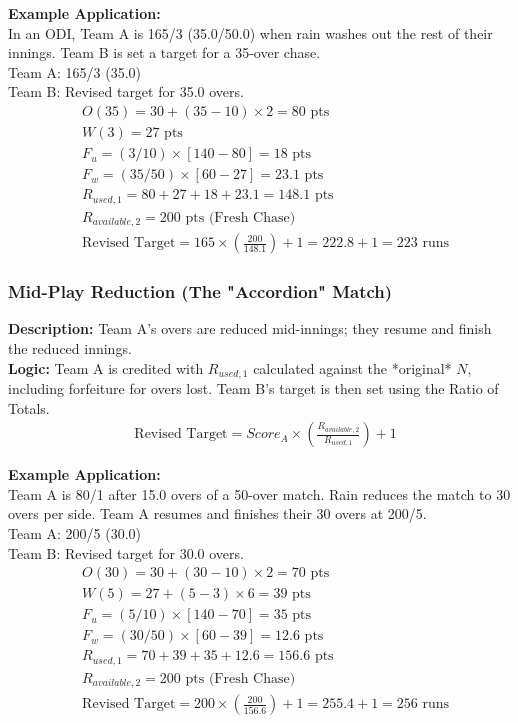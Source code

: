 \documentclass[12pt, letterpaper, fleqn]{article}
\begin{document}
\indent \textbf{Example Application:} \\
In an ODI, Team A is 165/3 (35.0/50.0) when rain washes out the rest of their innings. Team B is set a target for a 35-over chase. \\
Team A: 165/3 (35.0) \\
Team B: Revised target for 35.0 overs.
\begin{align*}
& O(35) = 30 + (35-10) \times 2 = 80 \text{ pts} \\
& W(3) = 27 \text{ pts} \\
& F_u = (3/10) \times [140 - 80] = 18 \text{ pts} \\
& F_w = (35/50) \times [60 - 27] = 23.1 \text{ pts} \\
& R_{used,1} = 80 + 27 + 18 + 23.1 = 148.1 \text{ pts} \\
& R_{available,2} = 200 \text{ pts (Fresh Chase)} \\
& \text{Revised Target} = 165 \times \left( \frac{200}{148.1} \right) + 1 = 222.8 + 1 = 223 \text{ runs}
\end{align*}

\subsubsection{Mid-Play Reduction (The "Accordion" Match)}
\indent \textbf{Description:} Team A's overs are reduced mid-innings; they resume and finish the reduced innings. \\
\indent \textbf{Logic:} Team A is credited with $R_{used,1}$ calculated against the *original* $N$, including forfeiture for overs lost. Team B's target is then set using the Ratio of Totals.
\begin{align*}
& \text{Revised Target} = Score_A \times \left( \frac{R_{available,2}}{R_{used,1}} \right) + 1
\end{align*}

\indent \textbf{Example Application:} \\
Team A is 80/1 after 15.0 overs of a 50-over match. Rain reduces the match to 30 overs per side. Team A resumes and finishes their 30 overs at 200/5. \\
Team A: 200/5 (30.0) \\
Team B: Revised target for 30.0 overs.
\begin{align*}
& O(30) = 30 + (30-10) \times 2 = 70 \text{ pts} \\
& W(5) = 27 + (5-3) \times 6 = 39 \text{ pts} \\
& F_u = (5/10) \times [140 - 70] = 35 \text{ pts} \\
& F_w = (30/50) \times [60 - 39] = 12.6 \text{ pts} \\
& R_{used,1} = 70 + 39 + 35 + 12.6 = 156.6 \text{ pts} \\
& R_{available,2} = 200 \text{ pts (Fresh Chase)} \\
& \text{Revised Target} = 200 \times \left( \frac{200}{156.6} \right) + 1 = 255.4 + 1 = 256 \text{ runs}
\end{align*}
\end{document}
